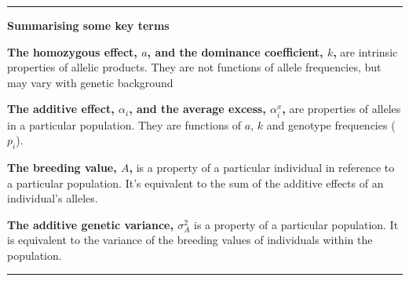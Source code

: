 \documentclass[
]{article}
\begin{document}
\begin{center}\rule{0.5\linewidth}{0.5pt}\end{center}

\textbf{Summarising some key terms}

\textbf{The homozygous effect, \(a\), and the dominance coefficient,
\(k\),} are intrinsic properties of allelic products. They are not
functions of allele frequencies, but may vary with genetic background

\textbf{The additive effect, \(\alpha_i\), and the average excess,
\(\alpha^x_i\),} are properties of alleles in a particular population.
They are functions of \(a\), \(k\) and genotype frequencies (\(p_i\)).

\textbf{The breeding value, \(A\),} is a property of a particular
individual in reference to a particular population. It's equivalent to
the sum of the additive effects of an individual's alleles.

\textbf{The additive genetic variance, \(\sigma^2_A\)} is a property of
a particular population. It is equivalent to the variance of the
breeding values of individuals within the population.

\begin{center}\rule{0.5\linewidth}{0.5pt}\end{center}
\end{document}
